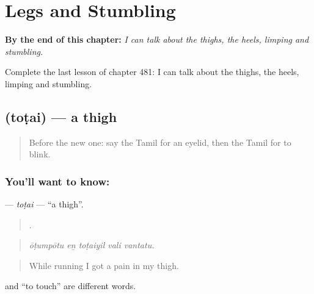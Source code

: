 
\chapter{Legs and Stumbling}
\label{ch:ta-legs-and-stumbling}

\begin{chapteropening}
\textbf{By the end of this chapter:} \emph{I can talk about the thighs, the heels, limping and stumbling.}

Complete the last lesson of chapter 481: I can talk about the thighs, the heels, limping and stumbling.
\end{chapteropening}

\section[\texorpdfstring{\ta{தொடை} (toṭai)}{தொடை (toṭai)}]{ (toṭai) — a thigh}

\label{lesson:TA-C481-totai}



\begin{quote}
Before the new one: say the Tamil for an eyelid, then the Tamil for to blink.
\end{quote}

\subsection*{You'll want to know: }
\textbf{} — \emph{toṭai} — \textquotedblleft{}a thigh\textquotedblright{}.

\begin{quote}
    .
\end{quote}

\begin{quote}
\emph{ōṭumpōtu eṉ toṭaiyil vali vantatu.}
\end{quote}

\begin{quote}
While running I got a pain in my thigh.
\end{quote}

 and  \textquotedblleft{}to touch\textquotedblright{} are different words.

